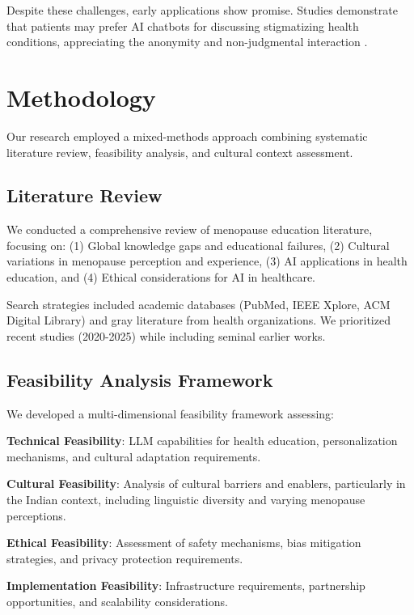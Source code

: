 \documentclass[letterpaper]{article} %
\begin{document}
Despite these challenges, early applications show promise. Studies demonstrate that patients may prefer AI chatbots for discussing stigmatizing health conditions, appreciating the anonymity and non-judgmental interaction \cite{digitalhealth2021sensitive}.

\section{Methodology}

Our research employed a mixed-methods approach combining systematic literature review, feasibility analysis, and cultural context assessment.

\subsection{Literature Review}

We conducted a comprehensive review of menopause education literature, focusing on: (1) Global knowledge gaps and educational failures, (2) Cultural variations in menopause perception and experience, (3) AI applications in health education, and (4) Ethical considerations for AI in healthcare.

Search strategies included academic databases (PubMed, IEEE Xplore, ACM Digital Library) and gray literature from health organizations. We prioritized recent studies (2020-2025) while including seminal earlier works.

\subsection{Feasibility Analysis Framework}

We developed a multi-dimensional feasibility framework assessing:

\textbf{Technical Feasibility}: LLM capabilities for health education, personalization mechanisms, and cultural adaptation requirements.

\textbf{Cultural Feasibility}: Analysis of cultural barriers and enablers, particularly in the Indian context, including linguistic diversity and varying menopause perceptions.

\textbf{Ethical Feasibility}: Assessment of safety mechanisms, bias mitigation strategies, and privacy protection requirements.

\textbf{Implementation Feasibility}: Infrastructure requirements, partnership opportunities, and scalability considerations.
\end{document}
